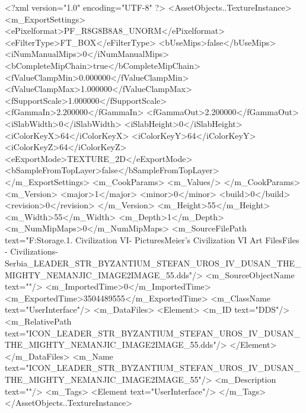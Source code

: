 <?xml version="1.0" encoding="UTF-8" ?>
<AssetObjects..TextureInstance>
	<m_ExportSettings>
		<ePixelformat>PF_R8G8B8A8_UNORM</ePixelformat>
		<eFilterType>FT_BOX</eFilterType>
		<bUseMips>false</bUseMips>
		<iNumManualMips>0</iNumManualMips>
		<bCompleteMipChain>true</bCompleteMipChain>
		<fValueClampMin>0.000000</fValueClampMin>
		<fValueClampMax>1.000000</fValueClampMax>
		<fSupportScale>1.000000</fSupportScale>
		<fGammaIn>2.200000</fGammaIn>
		<fGammaOut>2.200000</fGammaOut>
		<iSlabWidth>0</iSlabWidth>
		<iSlabHeight>0</iSlabHeight>
		<iColorKeyX>64</iColorKeyX>
		<iColorKeyY>64</iColorKeyY>
		<iColorKeyZ>64</iColorKeyZ>
		<eExportMode>TEXTURE_2D</eExportMode>
		<bSampleFromTopLayer>false</bSampleFromTopLayer>
	</m_ExportSettings>
	<m_CookParams>
		<m_Values/>
	</m_CookParams>
	<m_Version>
		<major>1</major>
		<minor>0</minor>
		<build>0</build>
		<revision>0</revision>
	</m_Version>
	<m_Height>55</m_Height>
	<m_Width>55</m_Width>
	<m_Depth>1</m_Depth>
	<m_NumMipMaps>0</m_NumMipMaps>
	<m_SourceFilePath text="F:\Mod Storage\2.1. Civilization VI\Mods\Archive - Pictures\Sid Meier's Civilization VI Art Files\Art Files - Civilizations\Civilization - Serbia\ICON_LEADER_STR_BYZANTIUM_STEFAN_UROS_IV_DUSAN_THE_MIGHTY_NEMANJIC_IMAGE2IMAGE_55.dds"/>
	<m_SourceObjectName text=""/>
	<m_ImportedTime>0</m_ImportedTime>
	<m_ExportedTime>3504489555</m_ExportedTime>
	<m_ClassName text="UserInterface"/>
	<m_DataFiles>
		<Element>
			<m_ID text="DDS"/>
			<m_RelativePath text="ICON_LEADER_STR_BYZANTIUM_STEFAN_UROS_IV_DUSAN_THE_MIGHTY_NEMANJIC_IMAGE2IMAGE_55.dds"/>
		</Element>
	</m_DataFiles>
	<m_Name text="ICON_LEADER_STR_BYZANTIUM_STEFAN_UROS_IV_DUSAN_THE_MIGHTY_NEMANJIC_IMAGE2IMAGE_55"/>
	<m_Description text=""/>
	<m_Tags>
		<Element text="UserInterface"/>
	</m_Tags>
</AssetObjects..TextureInstance>

